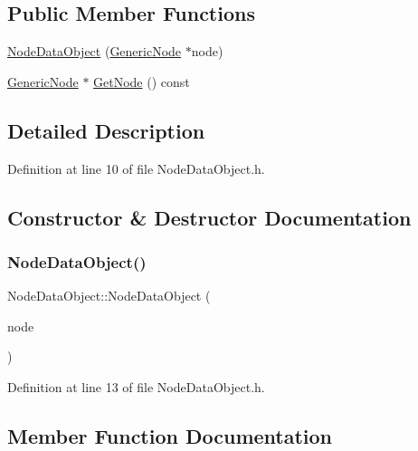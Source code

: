 \subsection*{Public Member Functions}
\begin{DoxyCompactItemize}
\item 
\hyperlink{class_node_data_object_aea0d7ac570f068084197a79c51b99e10}{Node\+Data\+Object} (\hyperlink{class_generic_node}{Generic\+Node} $\ast$node)
\item 
\hyperlink{class_generic_node}{Generic\+Node} $\ast$ \hyperlink{class_node_data_object_a924b72615772c26f9ae888ff5357b86e}{Get\+Node} () const
\end{DoxyCompactItemize}


\subsection{Detailed Description}


Definition at line 10 of file Node\+Data\+Object.\+h.



\subsection{Constructor \& Destructor Documentation}
\mbox{\label{class_node_data_object_aea0d7ac570f068084197a79c51b99e10}} 
\subsubsection{\texorpdfstring{Node\+Data\+Object()}{NodeDataObject()}}
{\footnotesize\ttfamily Node\+Data\+Object\+::\+Node\+Data\+Object (\begin{DoxyParamCaption}\item[{\hyperlink{class_generic_node}{Generic\+Node} $\ast$}]{node }\end{DoxyParamCaption})\hspace{0.3cm}{\ttfamily [inline]}}



Definition at line 13 of file Node\+Data\+Object.\+h.



\subsection{Member Function Documentation}
\mbox{\label{class_node_data_object_a924b72615772c26f9ae888ff5357b86e}} 
